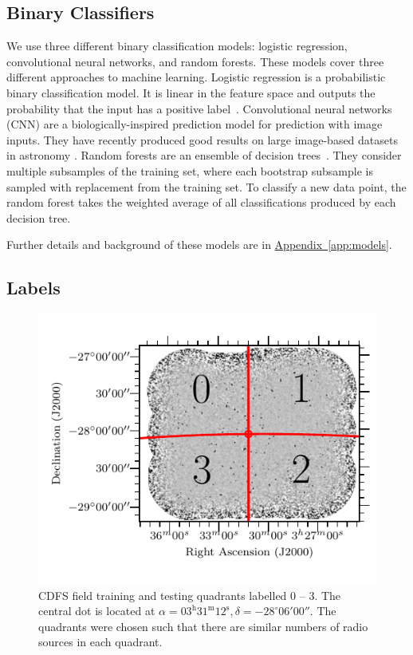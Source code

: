 \documentclass[fleqn,usenatbib,usedcolumn]{mnras}
\newcommand{\aref}[1]{\hyperref[#1]{Appendix~\ref{#1}}}
\begin{document}
  \subsection{Binary Classifiers}\label{sec:classifiers}

    We use three different binary classification models: logistic regression,
    convolutional neural networks, and random forests. These models cover
    three different approaches to machine learning. Logistic regression is a
    probabilistic binary classification model. It is linear in the feature
    space and outputs the probability that the input has a positive
    label~\citep[Chap. 4]{bishop06ml}. Convolutional neural networks (CNN) are
    a biologically-inspired prediction model for prediction with image inputs.
    They have recently produced good results on large image-based datasets in
    astronomy \citep[e.g.][Lukic et al. in press]{dieleman15cnn}. Random
    forests are an ensemble of decision trees~\citep{breiman01random-forest}.
    They consider multiple subsamples of the training set, where each
    bootstrap subsample is sampled with replacement from the training set. To
    classify a new data point, the random forest takes the weighted average of
    all classifications produced by each decision tree.

    Further details and background of these models are in \aref{app:models}.

  \subsection{Labels}\label{sec:labels}
    \begin{figure}
      \centering
      \includegraphics[width=\columnwidth, trim={0cm 0.5cm 0cm 0.5cm}, clip]{images/quadrants.pdf}
      \caption{CDFS field training and testing quadrants labelled 0 -- 3. The
        central dot is located at $\alpha = 03^\text{h}31^\text{m}12^\text{s},
        \delta = -28^\circ{}06'00''$. The quadrants were chosen such that
        there are similar numbers of radio sources in each
        quadrant.\label{fig:quadrants}}
    \end{figure}
\end{document}
